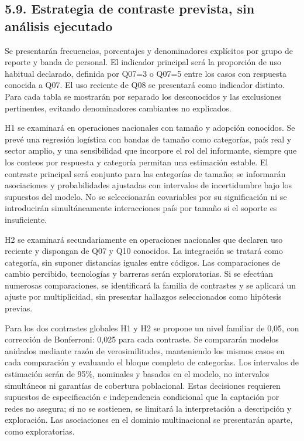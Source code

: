 \documentclass[12pt,letterpaper]{article}
\begin{document}
\subsection*{5.9. Estrategia de contraste prevista, sin análisis ejecutado}
Se presentarán frecuencias, porcentajes y denominadores explícitos por grupo de reporte y banda de personal. El indicador principal será la proporción de uso habitual declarado, definida por Q07=3 o Q07=5 entre los casos con respuesta conocida a Q07. El uso reciente de Q08 se presentará como indicador distinto. Para cada tabla se mostrarán por separado los desconocidos y las exclusiones pertinentes, evitando denominadores cambiantes no explicados.

H1 se examinará en operaciones nacionales con tamaño y adopción conocidos. Se prevé una regresión logística con bandas de tamaño como categorías, país real y sector amplio, y una sensibilidad que incorpore el rol del informante, siempre que los conteos por respuesta y categoría permitan una estimación estable. El contraste principal será conjunto para las categorías de tamaño; se informarán asociaciones y probabilidades ajustadas con intervalos de incertidumbre bajo los supuestos del modelo. No se seleccionarán covariables por su significación ni se introducirán simultáneamente interacciones país por tamaño si el soporte es insuficiente.

H2 se examinará secundariamente en operaciones nacionales que declaren uso reciente y dispongan de Q07 y Q10 conocidos. La integración se tratará como categoría, sin suponer distancias iguales entre códigos. Las comparaciones de cambio percibido, tecnologías y barreras serán exploratorias. Si se efectúan numerosas comparaciones, se identificará la familia de contrastes y se aplicará un ajuste por multiplicidad, sin presentar hallazgos seleccionados como hipótesis previas.

Para los dos contrastes globales H1 y H2 se propone un nivel familiar de 0,05, con corrección de Bonferroni: 0,025 para cada contraste. Se compararán modelos anidados mediante razón de verosimilitudes, manteniendo los mismos casos en cada comparación y evaluando el bloque completo de categorías. Los intervalos de estimación serán de 95\%, nominales y basados en el modelo, no intervalos simultáneos ni garantías de cobertura poblacional. Estas decisiones requieren supuestos de especificación e independencia condicional que la captación por redes no asegura; si no se sostienen, se limitará la interpretación a descripción y exploración. Las asociaciones en el dominio multinacional se presentarán aparte, como exploratorias.
\end{document}
